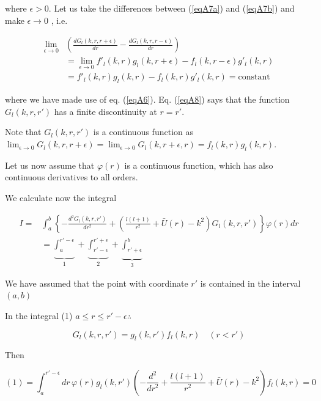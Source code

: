 where $\epsilon>0$. Let us take the differences between (\ref{eqA7a}) and (\ref{eqA7b}) and make $\epsilon \rightarrow 0$ , i.e.


\begin{equation}\label{eqA8}
\begin{split}
\lim_{\epsilon \rightarrow 0}& \left( \frac{dG_l(k,r,r+\epsilon)}{dr}-\frac{dG_l(k,r,r-\epsilon)}{dr}\right) \\
& =\lim_{\epsilon \rightarrow 0} f'_l(k,r)g_l(k,r+\epsilon)-f_l(k,r-\epsilon)g'_l(k,r)\\
&=f'_l(k,r)g_l(k,r)-f_l(k,r)g'_l(k,r)=\text{constant}
\end{split}
\end{equation}

where we have made use of eq. (\ref{eqA6}). Eq. (\ref{eqA8}) says that the function $G_l(k,r,r')$ has a finite discontinuity at $r=r'$.

Note that $G_l(k,r,r')$ is a continuous function as $\lim_{\epsilon \rightarrow 0} G_l(k,r,r+\epsilon)=\lim_{\epsilon \rightarrow 0} G_l(k,r+\epsilon,r)=f_l(k,r)g_l(k,r)$.


Let us now assume that $\varphi(r)$ is a continuous function, which has also continuous derivatives to all orders.

We calculate now the integral

\begin{equation}\label{eqA10}
\begin{split}
I=& \int_a^b\left\lbrace -\frac{d^2G_l(k,r,r')}{dr^2}+\left( \frac{l(l+1)}{r^2}+\bar U(r)-k^2\right) G_l(k,r,r')\right\rbrace \varphi(r) dr\\
&=\underbrace{\int_a^{r'-\epsilon}}_{1}+\underbrace{\int_{r'-\epsilon}^{r'+\epsilon}}_{2}+
\underbrace{\int_{r'+\epsilon}^b}_{\text{3}}
\end{split}
\end{equation}


We have assumed that the point with coordinate $r'$ is contained in the interval $(a,b)$

In the integral (1) $a\leq r  \leq r'-\epsilon \therefore $

\begin{equation*}
G_l(k,r,r')=g_l(k,r')f_l(k,r) \quad (r<  r')
\end{equation*}


Then

\begin{equation}\label{eqA11}
(1)=\int_a^{r'-\epsilon} dr\, \varphi(r) g_l(k,r') \left(-\frac{d^2}{dr^2}+ \frac{l(l+1)}{r^2}+\bar U(r)-k^2\right) f_l(k,r) =0
\end{equation}

